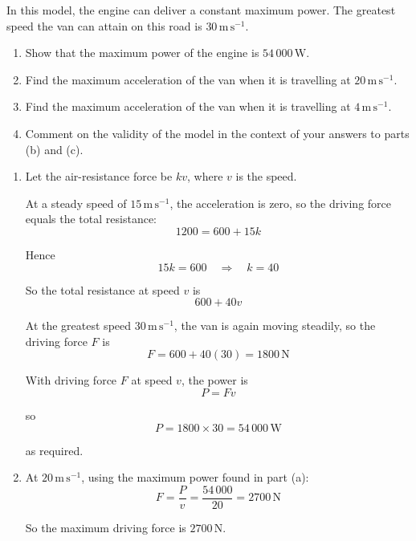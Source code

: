 \documentclass[leqno]{article}
\begin{document}
\begin{enumerate}[
  label=\textbf{\arabic*.},
  leftmargin=*,
  topsep=0pt,
  partopsep=0pt,
  parsep=0pt
]
In this model, the engine can deliver a constant maximum power. The greatest speed the van can attain on this road is $30\,\mathrm{m\,s^{-1}}$. \\

\begin{enumerate}[label=\textbf{(\alph*)}]
  \item Show that the maximum power of the engine is $54\,000\,\mathrm{W}$.  \\
  \item Find the maximum acceleration of the van when it is travelling at $20\,\mathrm{m\,s^{-1}}$.  \\
  \item Find the maximum acceleration of the van when it is travelling at $4\,\mathrm{m\,s^{-1}}$.  \\
  \item Comment on the validity of the model in the context of your answers to parts (b) and (c).  \\
\end{enumerate}

\vspace*{10pt}

\begin{djsSolution}
\begin{enumerate}[label=\textbf{(\alph*)}, start=1]
  \item Let the air-resistance force be \(kv\), where \(v\) is the speed.

At a steady speed of \(15\,\mathrm{m\,s^{-1}}\), the acceleration is zero, so the driving force equals the total resistance:
\[
1200 = 600 + 15k
\]

Hence
\[
15k = 600\quad\Longrightarrow\quad k=40
\]

So the total resistance at speed \(v\) is
\[
600+40v
\]

At the greatest speed \(30\,\mathrm{m\,s^{-1}}\), the van is again moving steadily, so the driving force \(F\) is
\[
F = 600+40(30)=1800\,\mathrm{N}
\]

With driving force \(F\) at speed \(v\), the power is
\[
P=Fv
\]

so
\[
P = 1800 \times 30 = 54\,000\,\mathrm{W}
\]

as required.

  \item At \(20\,\mathrm{m\,s^{-1}}\), using the maximum power found in part (a):
\[
F=\frac{P}{v}=\frac{54\,000}{20}=2700\,\mathrm{N}
\]

So the maximum driving force is \(2700\,\mathrm{N}\).


\end{enumerate}
\end{djsSolution}
\end{enumerate}
\end{document}
